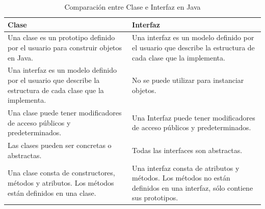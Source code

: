 \documentclass{report}
\begin{document}
    
\begin{table}[h]
\centering
\begin{tabular}{|p{7cm}|p{7cm}|} 
\hline  
\textbf{Clase} & \textbf{Interfaz}\\ 
\hline  
Una clase es un prototipo definido por el usuario para construir objetos en Java.& Una interfaz es un modelo definido por el usuario que describe la estructura de cada clase que la implementa.\\ 
\hline  
Una interfaz es un modelo definido por el usuario que describe la estructura de cada clase que la implementa.& No se puede utilizar para instanciar objetos.\\ 
\hline  
Una clase puede tener modificadores de acceso públicos y predeterminados.& Una Interfaz puede tener modificadores de acceso públicos y predeterminados.\\ 
\hline  
Las clases pueden ser concretas o abstractas.& Todas las interfaces son abstractas.\\ 
\hline  
Una clase consta de constructores, métodos y atributos. Los métodos están definidos en una clase.& Una interfaz consta de atributos y métodos. Los métodos no están definidos en una interfaz, sólo contiene sus prototipos.\\ 
\hline 
\end{tabular}
\caption{Comparación entre Clase e Interfaz en Java}
\label{tab:my_label}
\end{table}
\end{document}
